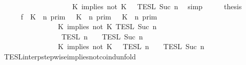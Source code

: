 \begin{isabellebody}
\ \ \ \ \ \ \ \ \ \ \ \ \ \ \ \ \ \ {\isasyminter}\ {\isasymlbrakk}{\isasymlbrakk}\ {\isacharparenleft}K\ implies\ not\ K\ {\isacharhash}\ {\isasymPhi}\ {\isasymrbrakk}{\isasymrbrakk}\isactrlsub T\isactrlsub E\isactrlsub S\isactrlsub L\isactrlbsup {\isasymge}\ Suc\ n\isactrlesup {\isacartoucheclose}\ \isamarkupfalse%
\ simp\isanewline
\ \ \isamarkupfalse%
\ \isamarkupfalse%
\ {\isacharquery}thesis\isanewline
\ \ \isamarkupfalse%
\ {\isacharminus}\isanewline
\ \ \ \ \isamarkupfalse%
\ f{}{\isacharcolon}\ {\isacartoucheopen}{\isacharparenleft}{\isasymlbrakk}\ K\ {\isasymnot}{\isasymUp}\ n\ {\isasymrbrakk}\isactrlsub p\isactrlsub r\isactrlsub i\isactrlsub m\ {\isasymunion}\ {\isasymlbrakk}\ K\ {\isasymUp}\ n\ {\isasymrbrakk}\isactrlsub p\isactrlsub r\isactrlsub i\isactrlsub m\ {\isasyminter}\ {\isasymlbrakk}\ K\ {\isasymnot}{\isasymUp}\ n\ {\isasymrbrakk}\isactrlsub p\isactrlsub r\isactrlsub i\isactrlsub m{\isacharparenright}\isanewline
\ \ \ \ \ \ \ \ \ \ \ \ \ \ {\isasyminter}\ {\isasymlbrakk}\ K\ implies\ not\ K\ {\isasymrbrakk}\isactrlsub T\isactrlsub E\isactrlsub S\isactrlsub L\isactrlbsup {\isasymge}\ Suc\ n\isactrlesup \isanewline
\ \ \ \ \ \ \ \ \ \ \ \ \ \ {\isasyminter}\ {\isacharparenleft}{\isasymlbrakk}{\isasymlbrakk}\ {\isasymPsi}\ {\isasymrbrakk}{\isasymrbrakk}\isactrlsub T\isactrlsub E\isactrlsub S\isactrlsub L\isactrlbsup {\isasymge}\ n\isactrlesup \ {\isasyminter}\ {\isasymlbrakk}{\isasymlbrakk}\ {\isasymPhi}\ {\isasymrbrakk}{\isasymrbrakk}\isactrlsub T\isactrlsub E\isactrlsub S\isactrlsub L\isactrlbsup {\isasymge}\ Suc\ n\isactrlesup {\isacharparenright}\isanewline
\ \ \ \ \ \ \ \ \ \ \ \ \ \ {\isacharequal}\ {\isasymlbrakk}{\isasymlbrakk}\ {\isacharparenleft}K\ implies\ not\ K\ {\isacharhash}\ {\isasymPsi}\ {\isasymrbrakk}{\isasymrbrakk}\isactrlsub T\isactrlsub E\isactrlsub S\isactrlsub L\isactrlbsup {\isasymge}\ n\isactrlesup \ {\isasyminter}\ {\isasymlbrakk}{\isasymlbrakk}\ {\isasymPhi}\ {\isasymrbrakk}{\isasymrbrakk}\isactrlsub T\isactrlsub E\isactrlsub S\isactrlsub L\isactrlbsup {\isasymge}\ Suc\ n\isactrlesup {\isacartoucheclose}\isanewline
\ \ \ \ \ \ \isamarkupfalse%
\ TESL{\isacharunderscore}interp{\isacharunderscore}stepwise{\isacharunderscore}implies{\isacharunderscore}not{\isacharunderscore}coind{\isacharunderscore}unfold\isanewline

\end{isabellebody}

